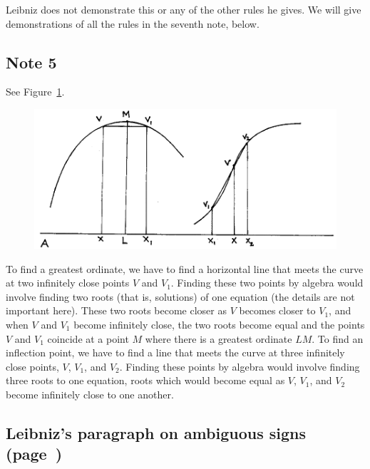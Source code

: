 \documentclass[polutonikogreek,english,twoside,openright]{article}
\begin{document}
Leibniz does not demonstrate this or any of the other rules he gives.
We will give demonstrations of all the rules in the seventh note,
below.

\subsection*{Note 5}
\label{cnm5}

See Figure~\ref{maxinf}. 
\begin{figure}[ht]
\begin{center}
\includegraphics[width=\textwidth]{fig/Figure10}
\caption{}
\label{maxinf}
\vspace{-10pt}
\end{center}
\end{figure} To find a greatest ordinate, we have to find a horizontal
line that meets the curve at two infinitely close points $V$ and
$V_1$.  Finding these two points by algebra would involve finding two
roots (that is, solutions) of one equation (the details are not
important here).  These two roots become closer as $V$ becomes closer
to $V_1$, and when $V$ and $V_1$ become infinitely close, the two
roots become equal and the points $V$ and $V_1$ coincide at a point
$M$ where there is a greatest ordinate $LM$.  To find an inflection
point, we have to find a line that meets the curve at three infinitely
close points, $V$, $V_1$, and $V_2$.  Finding these points by algebra
would involve finding three roots to one equation, roots which would
become equal as $V$, $V_1$, and $V_2$ become infinitely close to one
another.

\subsection*{Leibniz's paragraph on ambiguous signs (page~\pageref{ambsigns})}
\label{ompar}
\end{document}
